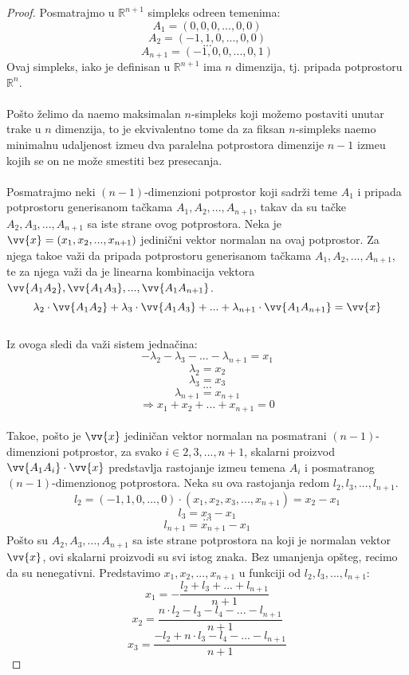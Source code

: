 \documentclass[11pt,letter]{article}
\begin{document}
\begin{proof}
Posmatrajmo u $\mathbb{R}^{n+1}$ simpleks odre\dj en temenima:
$$A_1=(0, 0, 0, ..., 0, 0)$$
$$A_2=(-1, 1, 0, ..., 0, 0)$$
$$...$$
$$A_{n+1}=(-1,0,0,..., 0, 1)$$
Ovaj simpleks, iako je definisan u $\mathbb{R}^{n+1}$ ima $n$ dimenzija, tj. pripada potprostoru $\mathbb{R}^n$. 
 \\
\\
\indent Po\v sto \v zelimo da na\dj emo maksimalan $n$-simpleks koji mo\v zemo postaviti unutar trake u $n$ dimenzija, to je ekvivalentno tome da za fiksan $n$-simpleks na\dj emo minimalnu udaljenost izme\dj u dva paralelna potprostora dimenzije $n-1$ izme\dj u kojih se on ne mo\v ze smestiti bez presecanja.
\\
\\
\indent Posmatrajmo neki $(n-1)$-dimenzioni potprostor koji sadr\v zi teme $A_1$ i pripada potprostoru generisanom ta\v ckama $A_1, A_2,..., A_{n+1}$, takav da su ta\v cke $A_2, A_3,..., A_{n+1}$ sa iste strane ovog potprostora. Neka je $\vv{x}=(x_1, x_2,..., x_{n+1})$ jedini\v cni vektor normalan na ovaj potprostor. Za njega tako\dj e va\v zi da pripada potprostoru generisanom ta\v ckama $A_1, A_2,..., A_{n+1}$, te za njega va\v zi da je linearna kombinacija vektora $\vv{A_1A_2}, \vv{A_1A_3},...,\vv{A_1 A_{n+1}}$.
\\
$$\lambda_2 \cdot \vv{A_1A_2}+\lambda_3 \cdot \vv{A_1A_3}+...+\lambda_{n+1}\cdot \vv{A_1A_{n+1}}=\vv{x}$$
\\
Iz ovoga sledi da va\v zi sistem jedna\v cina:
$$ -\lambda_2-\lambda_3-...-\lambda_{n+1}=x_1$$
$$\lambda_2=x_2$$
$$\lambda_3=x_3$$
$$...$$
$$\lambda_{n+1}=x_{n+1}$$
$$\Rightarrow x_1+x_2+...+x_{n+1}=0 $$
\\
Tako\dj e, po\v sto je $\vv{x}$ jedini\v can vektor normalan na posmatrani $(n-1)$-dimenzioni potprostor, za svako $i\in {2, 3,..., n+1}$, skalarni proizvod $\vv{A_1A_i}\cdot \vv{x}$ predstavlja rastojanje izme\dj u temena $A_i$ i posmatranog $(n-1)$-dimenzionog potprostora. Neka su ova rastojanja redom $l_2, l_3,..., l_{n+1}$.
$$l_2=(-1, 1, 0,..., 0)\cdot (x_1, x_2, x_3,..., x_{n+1})=x_2-x_1$$
$$l_3=x_3-x_1$$
$$...$$
$$l_{n+1}=x_{n+1}-x_1$$
Po\v sto su $A_2, A_3,..., A_{n+1}$ sa iste strane potprostora na koji je normalan vektor $\vv{x}$, ovi skalarni proizvodi su svi istog znaka. Bez umanjenja op\v steg, recimo da su nenegativni.
Predstavimo $x_1, x_2,..., x_{n+1}$ u funkciji od $l_2, l_3,..., l_{n+1}$:
$$x_1=-\frac{l_2+l_3+...+l_{n+1}}{n+1}$$
$$x_2=\frac{n\cdot l_2-l_3-l_4-...-l_{n+1}}{n+1}$$
$$x_3=\frac{-l_2+n\cdot l_3-l_4-...-l_{n+1}}{n+1}$$

\end{proof}
\end{document}
